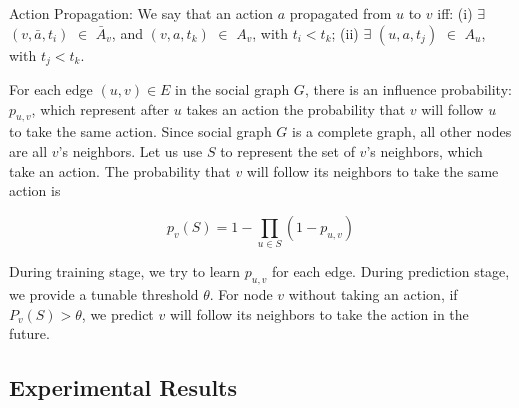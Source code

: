 \begin{definition}{Action Propagation:}
We say that an action $a$ propagated from $u$ to $v$ iff: (i) $\exists$ $(v, \bar{a}, t_i)$ $\in$ $\bar{A}_v$, 
and $(v, a, t_k)$ $\in$ $A_v$, with $t_i < t_k$; (ii) $\exists$ $(u, a, t_j)$ $\in$ $A_u$, with $t_j < t_k$. 
\end{definition}

For each edge $(u, v) \in E$ in the social graph $G$, 
there is an influence probability: $p_{u,v}$,
which represent after $u$ takes an action the probability that $v$ will follow $u$ to take the same action. 
Since social graph $G$ is a complete graph, 
all other nodes are all $v$'s neighbors. 
Let us use $S$ to represent the set of $v$'s neighbors, which take an action. 
The probability that $v$ will follow its neighbors to take the same action is

$$p_v(S) = 1 - \prod\limits_{u \in S}(1 - p_{u,v})$$

During training stage, we try to learn $p_{u,v}$ for each edge. 
During prediction stage, we provide a tunable threshold $\theta$. 
For node $v$ without taking an action, 
if $P_v(S)>\theta$, 
we predict $v$ will follow its neighbors to take the action in the future. 



\subsection{Experimental Results}

